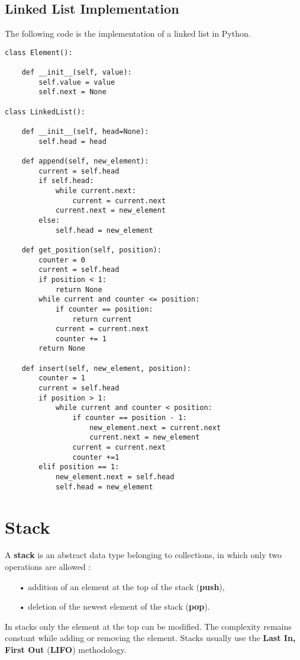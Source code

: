 \subsection{Linked List Implementation}
The following code is the implementation of a linked list in Python.
\begin{lstlisting}[firstnumber=1, caption={Linked List implementation.}]
class Element():

	def __init__(self, value):
		self.value = value
		self.next = None
		
class LinkedList():

	def __init__(self, head=None):
		self.head = head
		
	def append(self, new_element):
		current = self.head
		if self.head:
			while current.next:
				current = current.next
			current.next = new_element
		else:
			self.head = new_element
	
	def get_position(self, position):
		counter = 0
		current = self.head
		if position < 1:
			return None
		while current and counter <= position:
			if counter == position:
				return current
			current = current.next
			counter += 1
		return None
	
	def insert(self, new_element, position):
		counter = 1
		current = self.head
		if position > 1:
			while current and counter < position:
				if counter == position - 1:
					new_element.next = current.next
					current.next = new_element
				current = current.next
				counter +=1 
		elif position == 1:
			new_element.next = self.head
			self.head = new_element
\end{lstlisting}

\section{Stack}
\label{stack}
A \textbf{stack} is an abstract data type belonging to collections, in which only two operations are allowed \cite{wikistack}:
\begin{itemize}
\item[•] addition of an element at the top of the stack (\textbf{push}),
\item[•] deletion of the newest element of the stack (\textbf{pop}).
\end{itemize}
In stacks only the element at the top can be modified. The complexity remains constant while adding or removing the element. Stacks usually use the \textbf{Last In, First Out} (\textbf{LIFO}) methodology.

